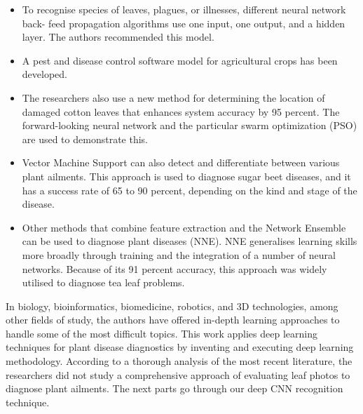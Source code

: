 \begin{itemize}
\item To recognise species of leaves, plagues, or illnesses, different neural network back-
feed propagation algorithms use one input, one output, and a hidden layer. The
authors recommended this model.

\item A pest and disease control software model for agricultural crops has been developed.

\item The researchers also use a new method for determining the location of damaged
cotton leaves that enhances system accuracy by 95 percent. The forward-looking neural
network and the particular swarm optimization (PSO) are used to demonstrate this.

\item Vector Machine Support can also detect and differentiate between various plant
ailments. This approach is used to diagnose sugar beet diseases, and it has a success
rate of 65 to 90 percent, depending on the kind and stage of the disease.

\item Other methods that combine feature extraction and the Network Ensemble can be
used to diagnose plant diseases (NNE). NNE generalises learning skills more broadly
through training and the integration of a number of neural networks. Because of its 91
percent accuracy, this approach was widely utilised to diagnose tea leaf problems.

\end{itemize}
In biology, bioinformatics, biomedicine, robotics, and 3D technologies, among other
fields of study, the authors have offered in-depth learning approaches to handle some
of the most difficult topics. This work applies deep learning techniques for plant
disease diagnostics by inventing and executing deep learning methodology. According
to a thorough analysis of the most recent literature, the researchers did not study a
comprehensive approach of evaluating leaf photos to diagnose plant ailments. The
next parts go through our deep CNN recognition technique.



